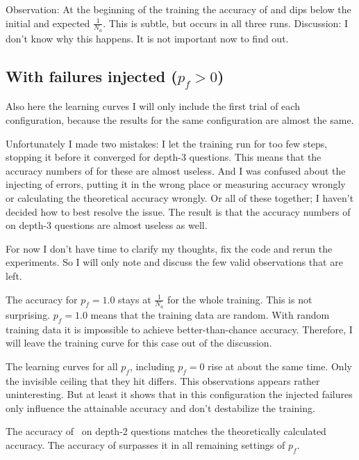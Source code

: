 \documentclass{farlamp}
\begin{document}
Observation: At the beginning of the training the accuracy of \AmpHp and \Xpa
dips below the initial and expected $\frac{1}{N_a}$. This is subtle, but occurs
in all three runs.
Discussion: I don't know why this happens. \OQ It is not important now to find
out.


\subsection{With failures injected ($p_f > 0$)}

Also here the learning curves I will only include the first trial of each
configuration, because the results for the same configuration are almost the
same.

Unfortunately I made two mistakes: I let the training run for too few steps,
stopping it before it converged for depth-3 questions. This means that the
accuracy numbers of \Xpa for these are almost useless. And I was confused about
the injecting of errors, putting it in the wrong place or measuring accuracy
wrongly or calculating the theoretical accuracy wrongly. Or all of these
together; I haven't decided how to best resolve the issue. The result is that
the accuracy numbers of \AmpHp on depth-3 questions are almost useless as well.

For now I don't have time to clarify my thoughts, fix the code and rerun the
experiments. So I will only note and discuss the few valid observations that are
left.

\Obs The accuracy for $p_f = 1.0$ stays at $\frac{1}{N_a}$ for the whole
training.
\Disc This is not surprising. $p_f = 1.0$ means that the training data are
random. With random training data it is impossible to achieve better-than-chance
accuracy. Therefore, I will leave the training curve for this case out of the
discussion.

\Obs The learning curves for all $p_f$, including $p_f = 0$ rise at about the
same time. Only the invisible ceiling that they hit differs.
\Disc This observations appears rather uninteresting. But at least it shows that
in this configuration the injected failures only influence the attainable
accuracy and don't destabilize the training.

\Obs The accuracy of \AmpHp\ on depth-2 questions matches the theoretically
calculated accuracy. The accuracy of \Xpa surpasses it in all remaining settings
of $p_f$.
\end{document}
